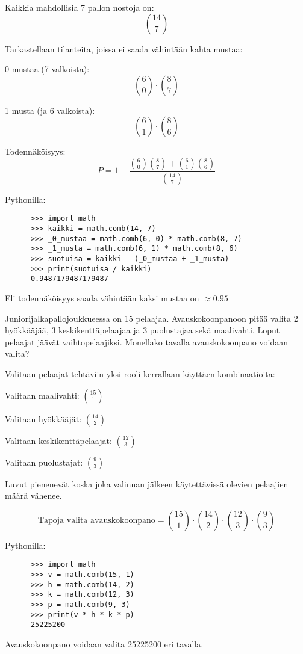 \documentclass[12pt,a4paper]{article}
\begin{document}
\begin{kohta}
  Kaikkia mahdollisia 7 pallon nostoja on:
  \[
  \binom{14}{7}
  \]

  Tarkastellaan tilanteita, joissa ei saada vähintään kahta mustaa:

  \begin{alakohta}
    \item 0 mustaa (7 valkoista):
    \[
    \binom{6}{0} \cdot \binom{8}{7}
    \]

    \item 1 musta (ja 6 valkoista):
    \[
    \binom{6}{1} \cdot \binom{8}{6}
    \]
  \end{alakohta}

\vspace{0.8cm}

  Todennäköisyys:
  \[
P = 1 - \frac{\binom{6}{0}\binom{8}{7} + \binom{6}{1}\binom{8}{6}}{\binom{14}{7}}
  \]

    Pythonilla:
    \begin{verbatim}
      >>> import math
      >>> kaikki = math.comb(14, 7)
      >>> _0_mustaa = math.comb(6, 0) * math.comb(8, 7)
      >>> _1_musta = math.comb(6, 1) * math.comb(8, 6)
      >>> suotuisa = kaikki - (_0_mustaa + _1_musta)
      >>> print(suotuisa / kaikki)
      0.9487179487179487
    \end{verbatim}
Eli todennäköisyys saada vähintään kaksi mustaa on $\approx 0.95$

\end{kohta}


\newpage
{}
Juniorijalkapallojoukkueessa on 15 pelaajaa.
Avauskokoonpanoon pitää valita 2 hyökkääjää,
3 keskikenttäpelaajaa ja 3 puolustajaa sekä maalivahti.
Loput pelaajat jäävät vaihtopelaajiksi.
Monellako tavalla avauskokoonpano voidaan valita? 
\vspace{0.4cm}

Valitaan pelaajat tehtäviin yksi rooli kerrallaan käyttäen kombinaatioita:

\begin{alakohta}
  \item Valitaan maalivahti: $\binom{15}{1}$
  \item Valitaan hyökkääjät: $\binom{14}{2}$
  \item Valitaan keskikenttäpelaajat: $\binom{12}{3}$
  \item Valitaan puolustajat: $\binom{9}{3}$
\end{alakohta}

Luvut pienenevät koska joka valinnan jälkeen käytettävissä
olevien pelaajien määrä vähenee.

\[
\text{Tapoja valita avauskokoonpano} = 
\binom{15}{1} \cdot 
\binom{14}{2} \cdot 
\binom{12}{3} \cdot 
\binom{9}{3}
\]

    Pythonilla:
    \begin{verbatim}
      >>> import math
      >>> v = math.comb(15, 1)
      >>> h = math.comb(14, 2)
      >>> k = math.comb(12, 3)
      >>> p = math.comb(9, 3)
      >>> print(v * h * k * p)
      25225200
    \end{verbatim}


\vspace{0.3cm}
Avauskokoonpano voidaan valita 25225200 eri tavalla.
\end{document}
